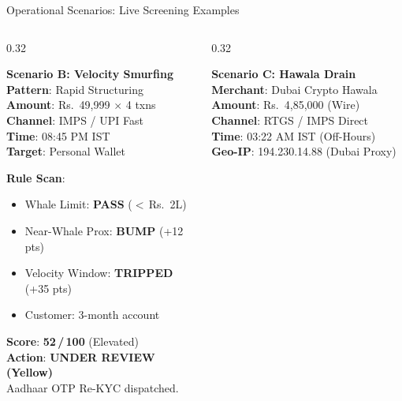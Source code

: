 \documentclass[aspectratio=169,10pt]{beamer}
\begin{document}
\begin{frame}{Operational Scenarios: Live Screening Examples}
\begin{columns}[t]
    \begin{column}{0.32\textwidth}
      \begin{alertblock}{\textbf{Scenario B: Velocity Smurfing}}
        \scriptsize
        \textbf{Pattern}: Rapid Structuring\\
        \textbf{Amount}: Rs.~49,999 $\times$ 4 txns\\
        \textbf{Channel}: IMPS / UPI Fast\\
        \textbf{Time}: 08:45 PM IST\\
        \textbf{Target}: Personal Wallet\\
        \par\vspace{0.2em}\dotfill\par

        \textbf{Rule Scan}:
        \begin{itemize}
          \tiny
          \item Whale Limit: \textcolor{statusGreen}{\textbf{PASS}} ($<$\,Rs.~2L)
          \item Near-Whale Prox: \textcolor{statusYellow}{\textbf{BUMP}} (+12 pts)
          \item Velocity Window: \textcolor{statusYellow}{\textbf{TRIPPED}} (+35 pts)
          \item Customer: 3-month account
        \end{itemize}
        \par\vspace{0.2em}\dotfill\par

        \textbf{Score}: \textbf{52\,/\,100} (Elevated)\\
        \textbf{Action}: \textcolor{statusYellow}{\textbf{UNDER REVIEW (Yellow)}}\\[1pt]
        \tiny Aadhaar OTP Re-KYC dispatched.
      \end{alertblock}
    \end{column}

    \begin{column}{0.32\textwidth}
      \begin{block}{\textbf{Scenario C: Hawala Drain}}
        \scriptsize
        \textbf{Merchant}: Dubai Crypto Hawala\\
        \textbf{Amount}: Rs.~4,85,000 (Wire)\\
        \textbf{Channel}: RTGS / IMPS Direct\\
        \textbf{Time}: 03:22 AM IST (Off-Hours)\\
        \textbf{Geo-IP}: 194.230.14.88 (Dubai Proxy)\\
        \par\vspace{0.2em}\dotfill\par


\end{block}
\end{column}
\end{columns}
\end{frame}
\end{document}
